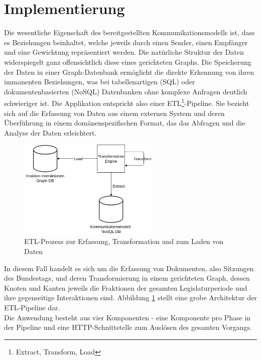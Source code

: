 \section{Implementierung}\label{sec:06_04_implementierung}
Die wesentliche Eigenschaft des bereitgestellten Kommunikationsmodells ist, dass es Beziehungen beinhaltet, welche jeweils durch einen Sender, einen Empfänger und eine 
Gewichtung repräsentiert werden. 
Die natürliche Struktur der Daten widerspiegelt ganz offensichtlich diese eines gerichteten Graphs. 
Die Speicherung der Daten in einer Graph-Datenbank ermöglicht die direkte Erkennung von ihren immanenten Beziehungen, was bei tabellenartigen (SQL) oder dokumentenbasierten (NoSQL) Datenbanken ohne komplexe Anfragen deutlich schwieriger ist. 
Die Applikation entspricht also einer ETL\footnote{Extract, Transform, Load}-Pipeline. Sie bezieht sich auf die Erfassung von Daten aus einem externen System und deren Überführung in einem domänenspezifischen
Format, das das Abfragen und die Analyse der Daten erleichtert. 
\begin{figure}[H]
    \centering
    \includegraphics[width=0.60\textwidth]{images/ETL_Factions.png}
    \caption{ETL-Prozess zur Erfassung, Transformation und zum Laden von Daten}
    \label{fig:faction-etl}
\end{figure}
In diesem Fall handelt es sich um die Erfassung von Dokumenten, also Sitzungen des Bundestags, und deren Transformierung in einem gerichteten Graph, dessen Knoten und Kanten jeweils die 
Fraktionen der gesamten Legislaturperiode und ihre gegenseitige Interaktionen sind. Abbildung \ref{fig:faction-etl} stellt eine grobe Architektur der ETL-Pipeline dar.\\
Die Anwendung besteht aus vier Komponenten - eine Komponente pro Phase in der Pipeline und eine HTTP-Schnittstelle zum Auslösen des gesamten Vorgangs.  
